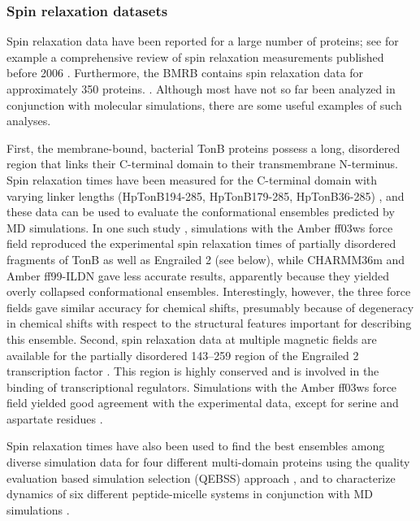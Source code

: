 \documentclass[9pt,review]{livecoms}
\begin{document}
\subsubsection{Spin relaxation datasets}
\label{sub2:spin_relax_datasets}

Spin relaxation data have been reported for a large number of proteins; see for example a comprehensive review of spin relaxation measurements published before 2006 \cite{jarymowycz_fast_2006}.
Furthermore, the BMRB contains spin relaxation data for approximately 350 proteins.
\cite{ulrich_biomagresbank_2008,romero_biomagresbank_2020,hoch_biological_2023}.
Although most have not so far been analyzed in conjunction with molecular simulations, there are some useful examples of such analyses.

First, the membrane-bound, bacterial TonB proteins possess a long, disordered region that links their C-terminal domain to their transmembrane N-terminus.
Spin relaxation times have been measured for the C-terminal domain with varying linker lengths (HpTonB194-285, HpTonB179-285, HpTonB36-285) \cite{ciragan_nmr_2020}, and these data can be used to evaluate the conformational ensembles predicted by MD simulations.
In one such study \cite{virtanen_heterogeneous_2020}, simulations with the Amber ff03ws force field reproduced the experimental spin relaxation times of partially disordered fragments of TonB as well as Engrailed 2 (see below), while CHARMM36m and Amber ff99-ILDN gave less accurate results, apparently because they yielded overly collapsed conformational ensembles.
Interestingly, however, the three force fields gave similar accuracy for chemical shifts, presumably because of degeneracy in chemical shifts with respect to the structural features important for describing this ensemble.
Second, spin relaxation data at multiple magnetic fields are available for the partially disordered 143–259 region of the Engrailed 2 transcription factor \cite{khan_distribution_2015}.
This region is highly conserved and is involved in the binding of transcriptional regulators.
Simulations with the Amber ff03ws force field yielded good agreement with the experimental data, except for serine and aspartate residues \cite{virtanen_heterogeneous_2020}.

Spin relaxation times have also been used to find the best ensembles among diverse simulation data for four different multi-domain proteins using the quality evaluation based simulation selection (QEBSS) approach \cite{sandelin_qebss_2024}, and to characterize dynamics of six different peptide-micelle systems in conjunction with MD simulations \cite{nencini_probing_2024}.
\end{document}
